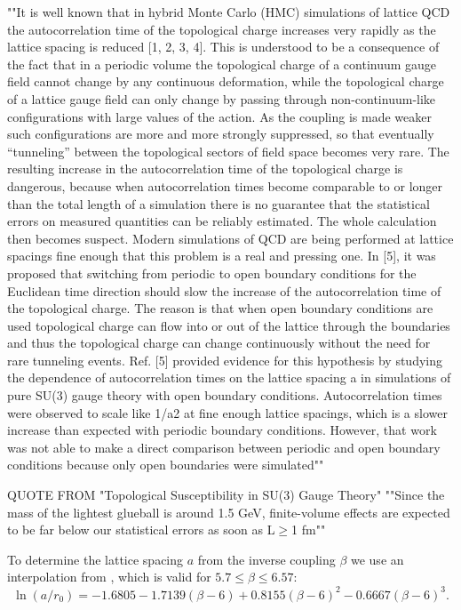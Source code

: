 \documentclass[a4paper,10pt]{article}
\begin{document}
""It is well known that in hybrid Monte Carlo (HMC) simulations of lattice
QCD the autocorrelation time of the topological charge increases very rapidly
as the lattice spacing is reduced [1, 2, 3, 4]. This is understood to be a
consequence of the fact that in a periodic volume the topological charge of a
continuum gauge field cannot change by any continuous deformation, while the topological charge of a lattice gauge field can only change by passing
through non-continuum-like configurations with large values of the action. As
the coupling is made weaker such configurations are more and more strongly
suppressed, so that eventually “tunneling” between the topological sectors
of field space becomes very rare.
The resulting increase in the autocorrelation time of the topological charge
is dangerous, because when autocorrelation times become comparable to or
longer than the total length of a simulation there is no guarantee that the statistical errors on measured quantities can be reliably estimated. The whole
calculation then becomes suspect. Modern simulations of QCD are being
performed at lattice spacings fine enough that this problem is a real and
pressing one.
In [5], it was proposed that switching from periodic to open boundary
conditions for the Euclidean time direction should slow the increase of the
autocorrelation time of the topological charge. The reason is that when open
boundary conditions are used topological charge can flow into or out of the
lattice through the boundaries and thus the topological charge can change
continuously without the need for rare tunneling events. Ref. [5] provided
evidence for this hypothesis by studying the dependence of autocorrelation
times on the lattice spacing a in simulations of pure SU(3) gauge theory with
open boundary conditions. Autocorrelation times were observed to scale like
1/a2 at fine enough lattice spacings, which is a slower increase than expected
with periodic boundary conditions. However, that work was not able to make
a direct comparison between periodic and open boundary conditions because
only open boundaries were simulated""\cite{PhysRevD.90.074502}

QUOTE FROM "Topological Susceptibility in SU(3) Gauge Theory"
""Since the mass of the
lightest glueball is around 1.5 GeV, finite-volume effects
are expected to be far below our statistical errors as soon as
L$\geq$1 fm""


To determine the lattice spacing $a$ from the inverse coupling $\beta$ we use an interpolation from \cite{Guagnelli_1998}, which is valid for $5.7 \leq \beta \leq 6.57$:
\begin{equation}\label{eq:avBeta_interpolated}
\ln \left(a / r_{0}\right)=-1.6805-1.7139(\beta-6)+0.8155(\beta-6)^{2}-0.6667(\beta-6)^{3}.
\end{equation}
\end{document}
